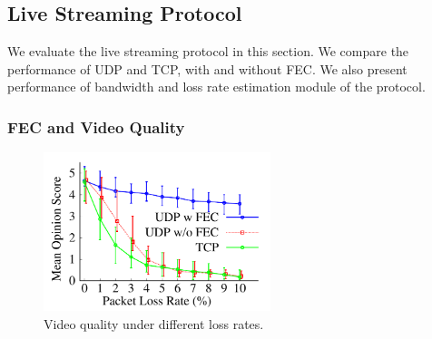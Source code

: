 \subsection{Live Streaming Protocol}

We evaluate the live streaming protocol in this section. 
We compare the performance of UDP and TCP, with and without
FEC. 
We also present performance of bandwidth and loss rate
estimation module of the protocol. 

\subsubsection{FEC and Video Quality}

\begin{figure}[t]
\centering
\vspace{-0.3cm}
\includegraphics[width=2.6in,angle=0]{Figs/RTDrive/evaluation/video_quality_errorbars.pdf}
\vspace{-0.3cm}
\caption{Video quality under different loss rates.}
\vspace{-0.2cm}
\label{loss_quality}
\centering
\end{figure}


